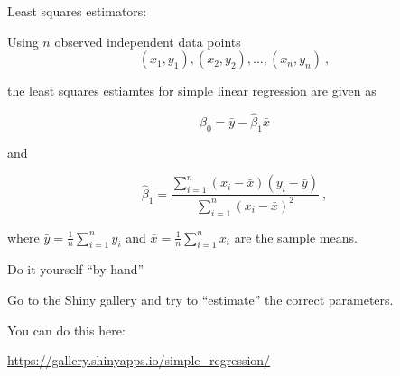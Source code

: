 \documentclass[10pt,ignorenonframetext,]{beamer}
\begin{document}
\begin{frame}

\begin{block}{Least squares estimators:}

Using \(n\) observed independent data points
\[(x_1,y_1), (x_2,y_2), \ldots, (x_n,y_n)\ ,\]

the least squares estiamtes for simple linear regression are given as

\begin{equation}\label{eq:beta0}
\hat{\beta}_0 = \bar{y}-\hat{\beta}_1 \bar{x}
\end{equation}

and

\begin{equation}\label{eq:beta1}
\hat{\beta}_1 = \frac{\sum_{i=1}^n(x_i-\bar{x})(y_i-\bar{y})}{\sum_{i=1}^n(x_i-\bar{x})^2} \ ,
\end{equation}

where \(\bar{y} = \frac{1}{n} \sum_{i=1}^n y_i\) and
\(\bar{x} = \frac{1}{n}\sum_{i=1}^n x_i\) are the sample means.

\end{block}

\end{frame}

\begin{frame}

\begin{block}{Do-it-yourself ``by hand''}

\vspace{6mm}

Go to the Shiny gallery and try to ``estimate'' the correct parameters.
\vspace{2mm}

You can do this here: \vspace{2mm}

\url{https://gallery.shinyapps.io/simple_regression/}

\end{block}

\end{frame}
\end{document}
